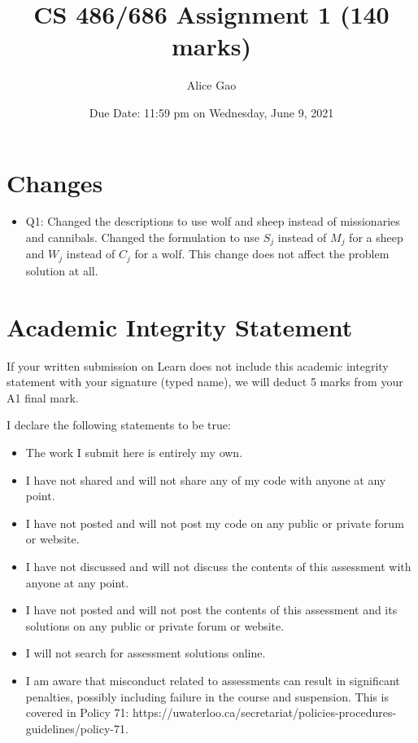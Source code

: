 \documentclass[12pt]{article}
\title{CS 486/686 Assignment 1 (140 marks)}
\author{Alice Gao}
\date{Due Date: 11:59 pm on Wednesday, June 9, 2021}
\begin{document}
\maketitle

\section*{Changes}

\begin{itemize}
  \item Q1: Changed the descriptions to use wolf and sheep instead of missionaries and cannibals. Changed the formulation to use $S_j$ instead of $M_j$ for a sheep and $W_j$ instead of $C_j$ for a wolf. This change does not affect the problem solution at all.
\end{itemize}

\newpage
\section*{Academic Integrity Statement}

{\color{red} If your written submission on Learn does not include this academic integrity statement with your signature (typed name), we will deduct 5 marks from your A1 final mark.}

I declare the following statements to be true:

\begin{itemize}
\item 
The work I submit here is entirely my own.

\item 	
I have not shared and will not share any of my code with anyone at any point. 

\item 
I have not posted and will not post my code on any public or private forum or website.

\item 	
I have not discussed and will not discuss the contents of this assessment with anyone at any point.

\item 
I have not posted and will not post the contents of this assessment and its solutions on any public or private forum or website. 

\item 
I will not search for assessment solutions online.

\item 
I am aware that misconduct related to assessments can result in significant penalties, possibly including failure in the course and suspension. This is covered in Policy 71: https://uwaterloo.ca/secretariat/policies-procedures-guidelines/policy-71.
\end{itemize}
\end{document}
